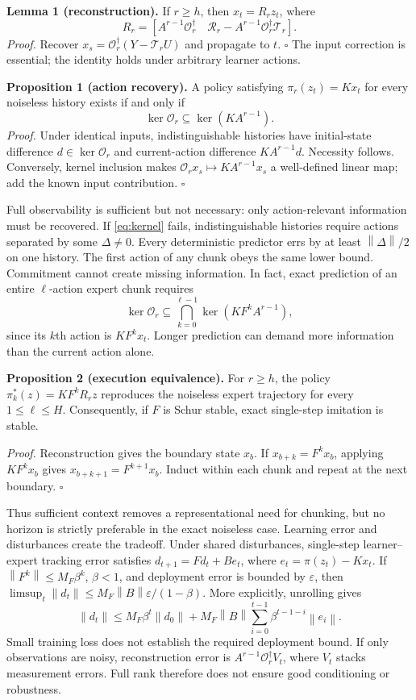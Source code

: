 \documentclass{l4dc2026}
\newcommand{\norm}[1]{\left\lVert#1\right\rVert}
\begin{document}
\textbf{Lemma 1 (reconstruction).} If $r\ge h$, then $x_t=R_rz_t$, where
\begin{equation}
R_r=[A^{r-1}\mathcal O_r^\dagger\quad\mathcal R_r-A^{r-1}\mathcal O_r^\dagger\mathcal T_r].
\label{eq:reconstruction}
\end{equation}
\emph{Proof.} Recover $x_s=\mathcal O_r^\dagger(Y-\mathcal T_rU)$ and propagate to $t$. $\square$ The input correction is essential; the identity holds under arbitrary learner actions.

\textbf{Proposition 1 (action recovery).} A policy satisfying $\pi_r(z_t)=Kx_t$ for every noiseless history exists if and only if
\begin{equation}\ker\mathcal O_r\subseteq\ker(KA^{r-1}).\label{eq:kernel}\end{equation}
\emph{Proof.} Under identical inputs, indistinguishable histories have initial-state difference $d\in\ker\mathcal O_r$ and current-action difference $KA^{r-1}d$. Necessity follows. Conversely, kernel inclusion makes $\mathcal O_rx_s\mapsto KA^{r-1}x_s$ a well-defined linear map; add the known input contribution. $\square$

Full observability is sufficient but not necessary: only action-relevant information must be recovered. If \eqref{eq:kernel} fails, indistinguishable histories require actions separated by some $\Delta\ne0$. Every deterministic predictor errs by at least $\norm{\Delta}/2$ on one history. The first action of any chunk obeys the same lower bound. Commitment cannot create missing information. In fact, exact prediction of an entire $\ell$-action expert chunk requires
\[
\ker\mathcal O_r\subseteq\bigcap_{k=0}^{\ell-1}\ker(KF^kA^{r-1}),
\]
since its $k$th action is $KF^kx_t$. Longer prediction can demand more information than the current action alone.

\textbf{Proposition 2 (execution equivalence).} For $r\ge h$, the policy $\pi_k^*(z)=KF^kR_rz$ reproduces the noiseless expert trajectory for every $1\le\ell\le H$. Consequently, if $F$ is Schur stable, exact single-step imitation is stable.

\emph{Proof.} Reconstruction gives the boundary state $x_b$. If $x_{b+k}=F^kx_b$, applying $KF^kx_b$ gives $x_{b+k+1}=F^{k+1}x_b$. Induct within each chunk and repeat at the next boundary. $\square$

Thus sufficient context removes a representational need for chunking, but no horizon is strictly preferable in the exact noiseless case. Learning error and disturbances create the tradeoff. Under shared disturbances, single-step learner--expert tracking error satisfies $d_{t+1}=Fd_t+Be_t$, where $e_t=\hat\pi(z_t)-Kx_t$. If $\norm{F^k}\le M_F\beta^k$, $\beta<1$, and deployment error is bounded by $\varepsilon$, then $\limsup_t\norm{d_t}\le M_F\norm{B}\varepsilon/(1-\beta)$. More explicitly, unrolling gives
\[
\norm{d_t}\le M_F\beta^t\norm{d_0}
+M_F\norm{B}\sum_{i=0}^{t-1}\beta^{t-1-i}\norm{e_i}.
\]
Small training loss does not establish the required deployment bound. If only observations are noisy, reconstruction error is $A^{r-1}\mathcal O_r^\dagger V_t$, where $V_t$ stacks measurement errors. Full rank therefore does not ensure good conditioning or robustness.
\end{document}

